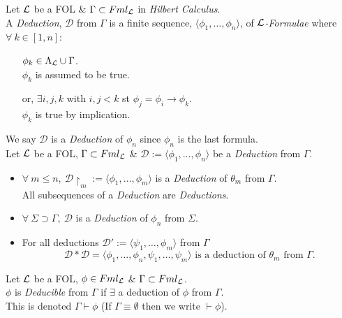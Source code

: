 \documentclass[11pt,a4paper]{article}
\begin{document}

Let $\mathcal{L}$ be a FOL \& $\Gamma\subset Fml_{\mathcal{L}}$ in \textit{Hilbert Calculus}.\\
A \textit{Deduction}, $\mathcal{D}$ from $\Gamma$ is a finite sequence, $\langle\phi_1,\dots,\phi_n\rangle$, of \textit{$\mathcal{L}$-Formulae} where $\forall\ k\in[1,n]$:
\begin{itemize}
	\item[] $\phi_k\in \Lambda_{\mathcal{L}}\cup\Gamma$.\\
	\ie $\phi_k$ is assumed to be true.
	\item[or,] $\exists i,j,k$ with $i,j<k$ st $\phi_j=\phi_i\to\phi_k$.\\
	\ie $\phi_k$ is true by implication.
\end{itemize}
\nb We say $\mathcal{D}$ is a \textit{Deduction} of $\phi_n$ since $\phi_n$ is the last formula.\\

Let $\mathcal{L}$ be a FOL, $\Gamma\subset Fml_{\mathcal{L}}$ \& $\mathcal{D}:=\langle\phi_1,\dots,\phi_n\rangle$ be a \textit{Deduction} from $\Gamma$.
\begin{itemize}
	\item $\forall\ m\leq n,\ \mathcal{D}\upharpoonright_m:=\langle\phi_1,\dots,\phi_m\rangle$ is a \textit{Deduction} of $\theta_m$ from $\Gamma$.\\
	\ie All subsequences of a \textit{Deduction} are \textit{Deductions}.
	\item $\forall\ \Sigma\supset\Gamma,\ \mathcal{D}$ is a \textit{Deduction} of $\phi_n$ from $\Sigma$.
	\item For all deductions $\mathcal{D}':=\langle\psi_1,\dots,\phi_m\rangle$ from $\Gamma$
	$$\mathcal{D}*\mathcal{D}=\langle\phi_1,\dots,\phi_n,\psi_1,\dots,\psi_m\rangle\text{ is a deduction of }\theta_{m}\text{ from }\Gamma.$$
\end{itemize}

Let $\mathcal{L}$ be a FOL, $\phi\in Fml_{\mathcal{L}}$ \& $\Gamma\subset Fml_{\mathcal{L}}$.\\
$\phi$ is \textit{Deducible} from $\Gamma$ if $\exists$ a deduction of $\phi$ from $\Gamma$.\\
\nb This is denoted $\Gamma\vdash\phi$ (If $\Gamma\equiv\emptyset$ then we write $\vdash\phi$).\\

\end{document}
